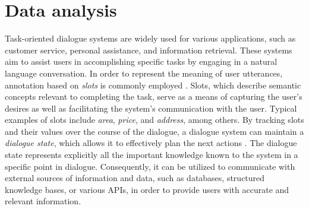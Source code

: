 \chapter{Data analysis}%
\label{chap:data_analysis}
Task-oriented dialogue systems are widely used for various applications, such as customer service, personal assistance, and information retrieval. These systems aim to assist users in accomplishing specific tasks by engaging in a natural language conversation. In order to represent the meaning of user utterances, annotation based on \emph{slots} is commonly employed \cite{young_pomdp-based_2013}. Slots, which describe semantic concepts relevant to completing the task, serve as a means of capturing the user's desires as well as facilitating the system's communication with the user. Typical examples of slots include \emph{area}, \emph{price}, and \emph{address}, among others. By tracking slots and their values over the course of the dialogue, a dialogue system can maintain a \emph{dialogue state}, which allows it to effectively plan the next actions \cite{williams2013dialog}. The dialogue state represents explicitly all the important knowledge known to the system in a specific point in dialogue. Consequently, it can be utilized to communicate with external sources of information and data, such as databases, structured knowledge bases, or various APIs, in order to provide users with accurate and relevant information.

